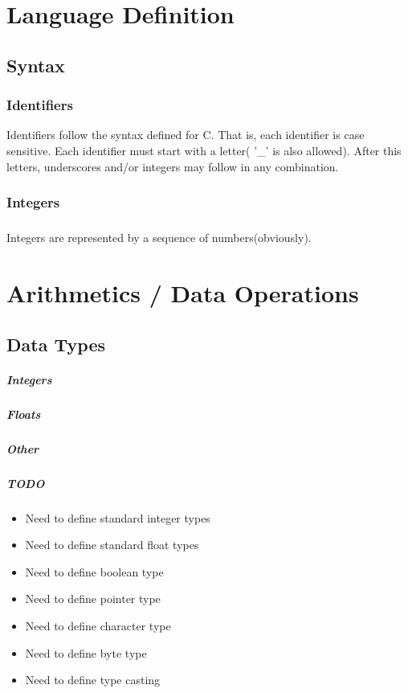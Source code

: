 \documentclass{report}
\begin{document}
\tableofcontents

\chapter{Language Definition}
	\section{Syntax}
		\subsection{Identifiers}
			Identifiers follow the syntax defined for C. That is, each identifier is case sensitive. Each identifier must start with a letter( '\_' is also allowed). After this letters, underscores and/or integers may follow in any combination.

	\subsection{Integers}
		\paragraph{}
			Integers are represented by a sequence of numbers(obviously).

\chapter{Arithmetics / Data Operations}
	\section{Data Types}
		\paragraph{Integers}
		\paragraph{Floats}
		\paragraph{Other}
		\paragraph{\color{red}TODO}
			\color{red}
			\begin{itemize}
				\item Need to define standard integer types
				\item Need to define standard float types
				\item Need to define boolean type
				\item Need to define pointer type
				\item Need to define character type
				\item Need to define byte type
				\item Need to define type casting
			\end{itemize}
			\color{black}
\end{document}
